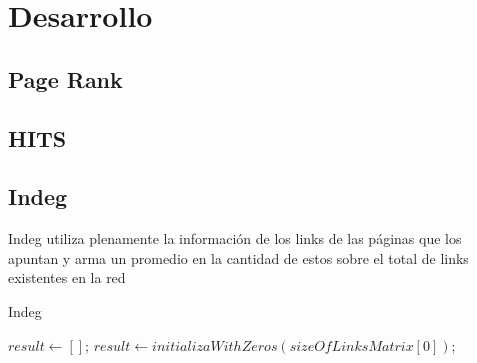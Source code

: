 \section{Desarrollo}

\subsection{Page Rank}

\subsection{HITS}

\subsection{Indeg}

Indeg utiliza plenamente la información de los links de las páginas que los apuntan y arma un promedio en la cantidad de estos sobre el total de links existentes en la red

\begin{algorithm}
\caption{Indeg}\label{euclid}
\begin{algorithmic}[1]
\State $result \gets []$;
\State $result \gets initializaWithZeros(sizeOfLinksMatrix[0])$;
	\ENDFOR
\ENDFOR
\end{algorithmic}
\end{algorithm}
